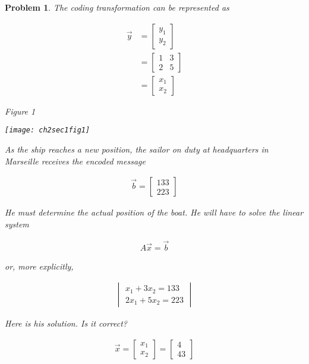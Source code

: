 \documentclass{article}
\newtheorem{problem}{Problem}
\begin{document}
\begin{problem}
The coding transformation can be represented as

\begin{align*}
\vec{y} 
&= \begin{bmatrix} y_{1} \\ y_{2} \end{bmatrix} \\
&= \begin{bmatrix} 1 & 3 \\ 2 & 5  \end{bmatrix} \\
&= \begin{bmatrix} x_{1} \\ x_{2} \end{bmatrix}
\end{align*}

Figure 1

\texttt{[image: ch2sec1fig1]} 


As the ship reaches a new position, the sailor on duty at headquarters in Marseille receives the encoded message

\begin{align*}
\vec{b} = \begin{bmatrix} 133 \\ 223 \end{bmatrix} 
\end{align*}

He must determine the actual position of the boat. He will have to solve the linear system

\begin{align*}
A\vec{x} = \vec{b}
\end{align*}

or, more explicitly,

\begin{align*}
\begin{vmatrix}
x_{1} + 3x_{2} = 133 \\
2x_{1} + 5x_{2} = 223
\end{vmatrix}
\end{align*}

Here is his solution. Is it correct?

\begin{align*}
\vec{x} = \begin{bmatrix} x_{1} \\ x_{2} \end{bmatrix} = \begin{bmatrix} 4 \\ 43 \end{bmatrix}
\end{align*}

\end{problem}
\end{document}
